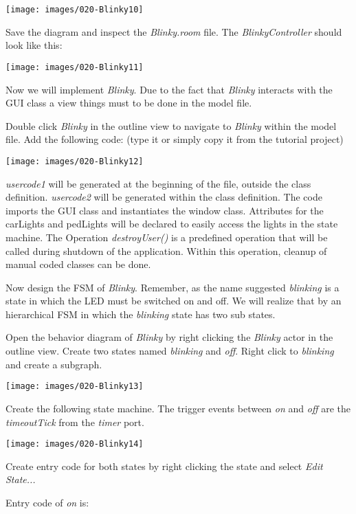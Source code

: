 \texttt{[image: images/020-Blinky10]}

Save the diagram and inspect the \textit{Blinky.room} file. The \textit{BlinkyController} should look like this:

\texttt{[image: images/020-Blinky11]}
 
Now we will implement \textit{Blinky}. Due to the fact that \textit{Blinky} interacts with the GUI class a view things must to be done in the model file.

Double click \textit{Blinky} in the outline view to navigate to \textit{Blinky} within the model file.
Add the following code:
(type it or simply copy it from the tutorial project)

\texttt{[image: images/020-Blinky12]}

\textit{usercode1} will be generated at the beginning of the file, outside the class definition. \textit{usercode2} will be generated within the class definition. The code imports the GUI class and instantiates the window class. Attributes for the carLights and pedLights will be declared to easily access the lights in the state machine.
The Operation \textit{destroyUser()} is a predefined operation that will be called during shutdown of the application. Within this operation, cleanup of manual coded classes can be done.
 
Now design the FSM of \textit{Blinky}. Remember, as the name suggested \textit{blinking} is a state in which the LED must be switched on and off. We will realize that by an hierarchical FSM in which the \textit{blinking} state has two sub states.

Open the behavior diagram of \textit{Blinky} by right clicking the \textit{Blinky} actor in the outline view. Create two states named \textit{blinking} and \textit{off}. Right click to \textit{blinking} and create a subgraph.

\texttt{[image: images/020-Blinky13]}

Create the following state machine. The trigger events between \textit{on} and \textit{off} are the \textit{timeoutTick} from the \textit{timer} port. 

\texttt{[image: images/020-Blinky14]}

Create entry code for both states by right clicking the state and select \textit{Edit State...}

Entry code of \textit{on} is:

